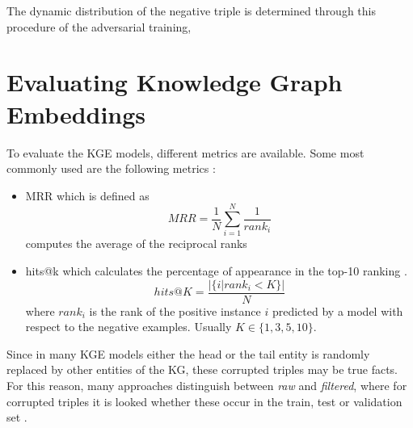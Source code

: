 The dynamic distribution of the negative triple is determined through this procedure of the adversarial training, 

\section{Evaluating Knowledge Graph Embeddings} 
To evaluate the \ac{KGE} models, different metrics are available.
Some most commonly used are the following metrics \cite{kotnis2017analysis}:
\begin{itemize}
    \item 
    \ac{MRR} which is defined as
    \begin{equation}
        MRR = \frac{1}{N} \sum_{i=1}^{N}\frac{1}{rank_i}
    \end{equation}
    computes the average of the reciprocal ranks \cite{zhang2021efficient}
    
    \item 
    hits@k which calculates the percentage of appearance in the top-10 ranking \cite{zhang2021efficient}.
    \begin{equation}
        hits@K = \frac{|\{i | rank_i < K\}|}{N}
    \end{equation}
    where $rank_i$ is the rank of the positive instance $i$ predicted by a model with respect to the negative examples.
    Usually $K \in \{1, 3, 5, 10\}$.
\end{itemize}
Since in many \ac{KGE} models either the head or the tail entity is randomly replaced by other entities of the KG, these corrupted triples may be true facts.
For this reason, many approaches distinguish between \textit{raw} and \textit{filtered}, where for corrupted triples it is looked whether these occur in the train, test or validation set \cite{TransE}.

